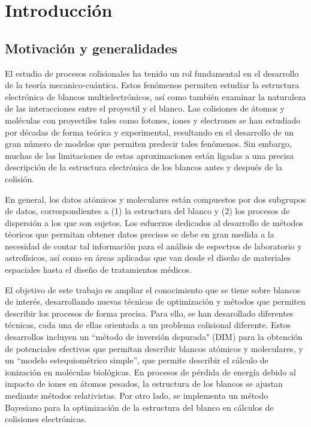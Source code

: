 \chapter{Introducción}

\section{Motivación y generalidades}

El estudio de procesos colisionales ha tenido un rol fundamental en el 
desarrollo de la teoría mecanico-cuántica. Estos fenómenos permiten 
estudiar la estructura electrónica de blancos multielectrónicos, así 
como también examinar la naturaleza de las interacciones entre el 
proyectil y el blanco. Las colisiones de átomos y moléculas con 
proyectiles tales como fotones, iones y electrones se han estudiado por 
décadas de forma teórica y experimental, resultando en el desarrollo de 
un gran número de modelos que permiten predecir tales fenómenos. Sin 
embargo, muchas de las limitaciones de estas aproximaciones están 
ligadas a una precisa descripción de la estructura electrónica de los 
blancos antes y después de la colisión. 

En general, los datos atómicos y moleculares están compuestos por dos 
subgrupos de datos, correspondientes a (1) la estructura del blanco y 
(2) los procesos de dispersión a los que son sujetos. Los esfuerzos 
dedicados al desarrollo de métodos téoricos que permitan obtener datos
precisos se debe en gran medida a la necesidad de contar tal información 
para el análisis de espectros de laboratorio y astrofísicos, así como en 
áreas aplicadas que van desde el diseño de materiales espaciales hasta 
el diseño de tratamientos médicos. 

El objetivo de este trabajo es ampliar el conocimiento que se tiene 
sobre blancos de interés, desarrollando nuevas técnicas de optimización 
y métodos que permiten describir los procesos de forma precisa. Para 
ello, se han desarollado diferentes técnicas, cada una de ellas 
orientada a un problema colisional diferente. Estos desarrollos incluyen 
un ``método de inversión depurada" (DIM) para la obtención de 
potenciales efectivos que permitan describir blancos atómicos y 
moleculares, y un ``modelo estequiométrico simple'', que
permite describir el cálculo de ionización en moléculas biológicas. 
En procesos de pérdida de energía debido al impacto de iones en átomos 
pesados, la estructura de los blancos se ajustan mediante métodos 
relativistas. Por otro lado, se implementa un método Bayesiano para la 
optimización de la estructura del blanco en cálculos de colisiones 
electrónicas.

